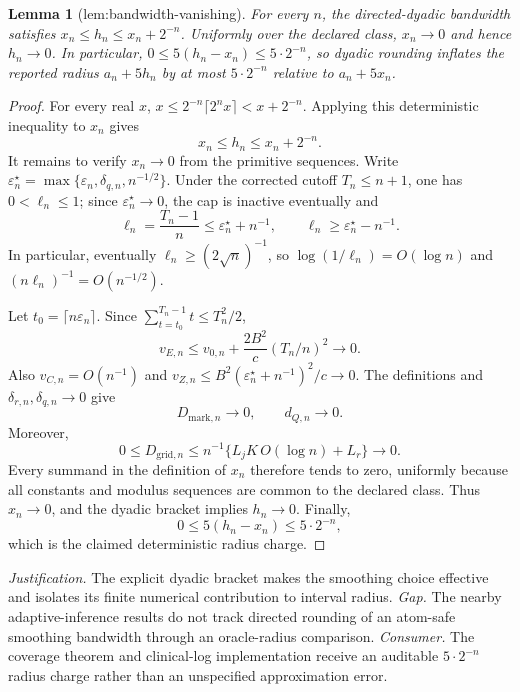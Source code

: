 \documentclass{article}
\newtheorem{lemma}{Lemma}
\begin{document}
\begin{lemma}[lem:bandwidth-vanishing]\label{lem:bandwidth-vanishing}
For every \(n\), the directed-dyadic bandwidth satisfies \(x_n\le h_n\le x_n+2^{-n}\). Uniformly over the declared class, \(x_n\to0\) and hence \(h_n\to0\). In particular, \(0\le5(h_n-x_n)\le5\cdot2^{-n}\), so dyadic rounding inflates the reported radius \(a_n+5h_n\) by at most \(5\cdot2^{-n}\) relative to \(a_n+5x_n\).
\end{lemma}
\begin{proof}
For every real \(x\), \(x\leq 2^{-n}\lceil2^n x\rceil<x+2^{-n}\).  Applying this deterministic inequality to \(x_n\) gives
\[
 x_n\leq h_n\leq x_n+2^{-n}.
\]
It remains to verify \(x_n\to0\) from the primitive sequences.  Write
\(\varepsilon_n^\star=\max\{\varepsilon_n,\delta_{q,n},n^{-1/2}\}\).
Under the corrected cutoff \(T_n\leq n+1\), one has \(0<\ell_n\leq1\);
since \(\varepsilon_n^\star\to0\), the cap is inactive eventually and
\[
 \ell_n=\frac{T_n-1}{n}\leq
 \varepsilon_n^\star+n^{-1},\qquad
 \ell_n\geq \varepsilon_n^\star-n^{-1}.
\]
In particular, eventually \(\ell_n\geq (2\sqrt n)^{-1}\), so
\(\log(1/\ell_n)=O(\log n)\) and
\((n\ell_n)^{-1}=O(n^{-1/2})\).

Let \(t_0=\lceil n\varepsilon_n\rceil\).  Since
\(\sum_{t=t_0}^{T_n-1}t\leq T_n^2/2\),
\[
 v_{E,n}\leq v_{0,n}+\frac{2B^2}{c}(T_n/n)^2\longrightarrow0.
\]
Also \(v_{C,n}=O(n^{-1})\) and
\(v_{Z,n}\leq B^2(\varepsilon_n^\star+n^{-1})^2/c\to0\).
The definitions and \(\delta_{r,n},\delta_{q,n}\to0\) give
\[
 D_{\mathrm{mark},n}\to0,\qquad d_{Q,n}\to0.
\]
Moreover,
\[
 0\leq D_{\mathrm{grid},n}
 \leq n^{-1}\{L_jK\,O(\log n)+L_r\}\longrightarrow0.
\]
Every summand in the definition of \(x_n\) therefore tends to zero, uniformly because all constants and modulus sequences are common to the declared class.  Thus \(x_n\to0\), and the dyadic bracket implies \(h_n\to0\).  Finally,
\[
 0\leq5(h_n-x_n)\leq5\cdot2^{-n},
\]
which is the claimed deterministic radius charge.
\end{proof}
\par\smallskip\noindent \textit{Justification.} The explicit dyadic bracket makes the smoothing choice effective and isolates its finite numerical contribution to interval radius. \textit{Gap.} The nearby adaptive-inference results do not track directed rounding of an atom-safe smoothing bandwidth through an oracle-radius comparison. \textit{Consumer.} The coverage theorem and clinical-log implementation receive an auditable \(5\cdot2^{-n}\) radius charge rather than an unspecified approximation error.
\end{document}
